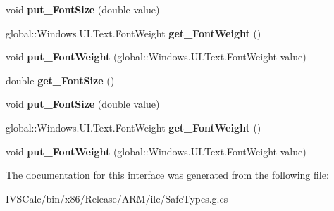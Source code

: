 \begin{DoxyCompactItemize}
void {\bfseries put\+\_\+\+Font\+Size} (double value)
\item 
\mbox{\label{interface_windows_1_1_u_i_1_1_xaml_1_1_documents_1_1_i_text_element_ab64a17e34aa47f76baa256e8b2ca584c}} 
global\+::\+Windows.\+U\+I.\+Text.\+Font\+Weight {\bfseries get\+\_\+\+Font\+Weight} ()
\item 
\mbox{\label{interface_windows_1_1_u_i_1_1_xaml_1_1_documents_1_1_i_text_element_a7ddd886d00bf098a3cf281d8c898aefb}} 
void {\bfseries put\+\_\+\+Font\+Weight} (global\+::\+Windows.\+U\+I.\+Text.\+Font\+Weight value)
\item 
\mbox{\label{interface_windows_1_1_u_i_1_1_xaml_1_1_documents_1_1_i_text_element_a2628455fb9bb6efd33aeb10bc4eb2db6}} 
double {\bfseries get\+\_\+\+Font\+Size} ()
\item 
\mbox{\label{interface_windows_1_1_u_i_1_1_xaml_1_1_documents_1_1_i_text_element_ab395151986a4eeb5ac6b9da03aa657b6}} 
void {\bfseries put\+\_\+\+Font\+Size} (double value)
\item 
\mbox{\label{interface_windows_1_1_u_i_1_1_xaml_1_1_documents_1_1_i_text_element_ab64a17e34aa47f76baa256e8b2ca584c}} 
global\+::\+Windows.\+U\+I.\+Text.\+Font\+Weight {\bfseries get\+\_\+\+Font\+Weight} ()
\item 
\mbox{\label{interface_windows_1_1_u_i_1_1_xaml_1_1_documents_1_1_i_text_element_a7ddd886d00bf098a3cf281d8c898aefb}} 
void {\bfseries put\+\_\+\+Font\+Weight} (global\+::\+Windows.\+U\+I.\+Text.\+Font\+Weight value)
\end{DoxyCompactItemize}


The documentation for this interface was generated from the following file\+:\begin{DoxyCompactItemize}
\item 
I\+V\+S\+Calc/bin/x86/\+Release/\+A\+R\+M/ilc/Safe\+Types.\+g.\+cs\end{DoxyCompactItemize}

